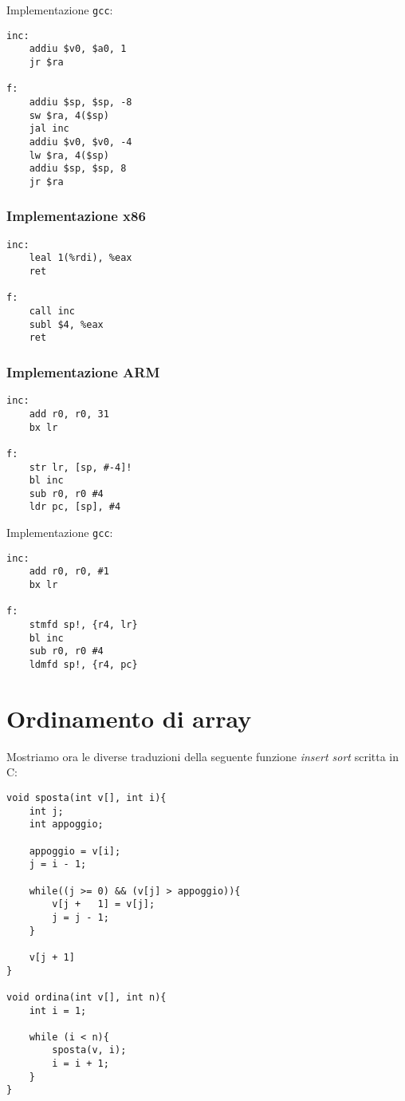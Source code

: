 \documentclass[class=book, crop=false, oneside]{standalone}
\begin{document}
Implementazione \texttt{gcc}:
\begin{verbatim}
inc:
	addiu $v0, $a0, 1
	jr $ra

f:
	addiu $sp, $sp, -8
	sw $ra, 4($sp)
	jal inc
	addiu $v0, $v0, -4
	lw $ra, 4($sp)
	addiu $sp, $sp, 8
	jr $ra
\end{verbatim}

\subsubsection{Implementazione x86}
\begin{verbatim}
inc:
	leal 1(%rdi), %eax
	ret

f:
	call inc
	subl $4, %eax
	ret
\end{verbatim}

\subsubsection{Implementazione ARM}
\begin{verbatim}
inc:
	add r0, r0, 31
	bx lr

f:
	str lr, [sp, #-4]!
	bl inc
	sub r0, r0 #4
	ldr pc, [sp], #4
\end{verbatim}

Implementazione \texttt{gcc}:
\begin{verbatim}
inc:
	add r0, r0, #1
	bx lr

f:
	stmfd sp!, {r4, lr}
	bl inc
	sub r0, r0 #4
	ldmfd sp!, {r4, pc}
\end{verbatim}

\section{Ordinamento di array}
Mostriamo ora le diverse traduzioni della seguente funzione \emph{insert sort} scritta in C:

\begin{verbatim}
void sposta(int v[], int i){
	int j;
	int appoggio;

	appoggio = v[i];
	j = i - 1;

	while((j >= 0) && (v[j] > appoggio)){
		v[j +	1] = v[j];
		j = j - 1;
	}

	v[j + 1]
}

void ordina(int v[], int n){
	int i = 1;

	while (i < n){
		sposta(v, i);
		i = i + 1;
	}
}
\end{verbatim}
\end{document}

